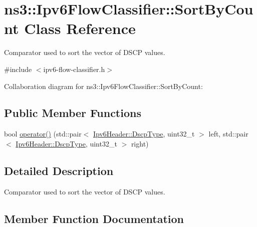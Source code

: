 \hypertarget{classns3_1_1Ipv6FlowClassifier_1_1SortByCount}{}\section{ns3\+:\+:Ipv6\+Flow\+Classifier\+:\+:Sort\+By\+Count Class Reference}
\label{classns3_1_1Ipv6FlowClassifier_1_1SortByCount}


Comparator used to sort the vector of D\+S\+CP values.  




{\ttfamily \#include $<$ipv6-\/flow-\/classifier.\+h$>$}



Collaboration diagram for ns3\+:\+:Ipv6\+Flow\+Classifier\+:\+:Sort\+By\+Count\+:
\subsection*{Public Member Functions}
\begin{DoxyCompactItemize}
\item 
bool \hyperlink{classns3_1_1Ipv6FlowClassifier_1_1SortByCount_aec5b25327dffd6f7d51c62494fcbfcdd}{operator()} (std\+::pair$<$ \hyperlink{classns3_1_1Ipv6Header_afdc89ed9acd990a7613782323e4c95ee}{Ipv6\+Header\+::\+Dscp\+Type}, uint32\+\_\+t $>$ left, std\+::pair$<$ \hyperlink{classns3_1_1Ipv6Header_afdc89ed9acd990a7613782323e4c95ee}{Ipv6\+Header\+::\+Dscp\+Type}, uint32\+\_\+t $>$ right)
\end{DoxyCompactItemize}


\subsection{Detailed Description}
Comparator used to sort the vector of D\+S\+CP values. 

\subsection{Member Function Documentation}
